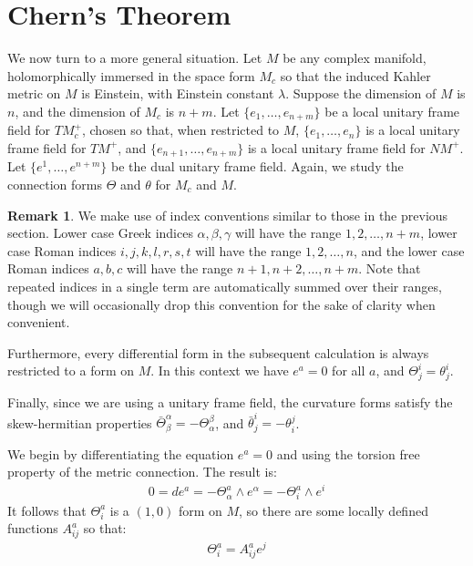 \documentclass[11pt]{amsart}
\def \TMp{ TM^{+} }
\def \NMp{ NM^+ }
\theoremstyle{definition}
\newtheorem{remark}[subsection]{Remark}
\begin{document}
\parskip 6pt
\parindent 0pt
\baselineskip 14pt

\section{Chern's Theorem}

We now turn to a more general situation.  Let $M$ be any complex manifold, holomorphically immersed in the space form $M_c$ so that the induced Kahler metric on $M$ is Einstein, with Einstein constant $\lambda$.  Suppose the dimension of $M$ is $n$, and the dimension of $M_c$ is $n+m$.  Let $\{ e_1, \ldots, e_{n+m} \}$ be a local unitary frame field for $TM_c^{+}$, chosen so that, when restricted to $M$, $\{ e_1, \ldots, e_n \}$ is a local unitary frame field for $\TMp$, and $\{ e_{n+1}, \ldots, e_{n+m} \}$ is a local unitary frame field for $\NMp$.  Let $\{ e^1, \ldots, e^{n+m} \}$ be the dual unitary frame field.  Again, we study the connection forms $\Theta$ and $\theta$ for $M_c$ and $M$.

\begin{remark}  We make use of index conventions similar to those in the previous section.  Lower case Greek indices $\alpha, \beta, \gamma$ will have the range $1,2, \ldots, n+m$, lower case Roman indices $i,j,k,l,r,s,t$ will have the range $1,2, \ldots, n$, and the lower case Roman indices $a,b,c$ will have the range $n+1, n+2, \ldots, n+m$.  Note that repeated indices in a single term are automatically summed over their ranges, though we will occasionally drop this convention for the sake of clarity when convenient.

Furthermore, every differential form in the subsequent calculation is always restricted to a form on $M$. In this context we have $e^a = 0$ for all $a$, and $\Theta^i_j = \theta^i_j$.

Finally, since we are using a unitary frame field, the curvature forms satisfy the skew-hermitian properties $\bar{\Theta}^{\alpha}_{\beta} = - \Theta^{\beta}_{\alpha}$, and $\bar{\theta}^i_j = - \theta^j_i$.
\end{remark}

We begin by differentiating the equation $e^a = 0$ and using the torsion free property of the metric connection.  The result is:
%
\begin{align*}
0 = d e^a = - \Theta^a_{\alpha} \wedge e^{\alpha} = - \Theta^a_i \wedge e^i
\end{align*}
%
It follows that $\Theta^a_i$ is a $(1,0)$ form on $M$, so there are some locally defined functions $A^a_{ij}$ so that:
%
\begin{align}
\Theta^a_i = A^a_{ij} e^j
\end{align}
\end{document}
